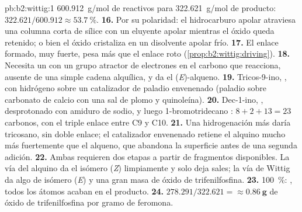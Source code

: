 \begin{solution}{pb:b2:wittig:1}
\qty{600.912}{g/mol} de reactivos para \qty{322.621}{g/mol} de producto: $322.621/600.912 \approx
53.7~\%$.
\textbf{16.} Por su polaridad: el hidrocarburo apolar atraviesa una columna corta de sílice con un
eluyente apolar mientras el óxido queda retenido; o bien el óxido cristaliza en un disolvente apolar frío.
\textbf{17.} El enlace  formado, muy fuerte, pesa más que el enlace  roto
(\cref{prop:b2:wittig:driving}).
\textbf{18.} Necesita un  con un grupo atractor de electrones en el carbono que reacciona, ausente
de una simple cadena alquílica, y da el (\textit{E})-alqueno.
\textbf{19.} Tricos-9-ino, , con hidrógeno sobre un catalizador de paladio
envenenado (paladio sobre carbonato de calcio con una sal de plomo y quinoleína).
\textbf{20.} Dec-1-ino, , desprotonado con amiduro de sodio, y luego 1-bromotridecano
: $8 + 2 + 13 = 23$ carbonos, con el triple enlace entre C9 y C10.
\textbf{21.} Una hidrogenación más daría tricosano, sin doble enlace; el catalizador envenenado
retiene el alquino mucho más fuertemente que el alqueno, que abandona la superficie antes de una segunda adición.
\textbf{22.} Ambas requieren dos etapas a partir de fragmentos disponibles. La vía del alquino da el isómero (\textit{Z})
limpiamente y solo deja sales; la vía de Wittig da algo de isómero (\textit{E}) y una gran masa de
óxido de trifenilfosfina.
\textbf{23.} 100~\%: , todos los átomos acaban en el producto.
\textbf{24.} $278.291/322.621 = \boldsymbol{\approx \qty{0.86}{g}}$ de óxido de trifenilfosfina por
gramo de feromona.
\end{solution}

